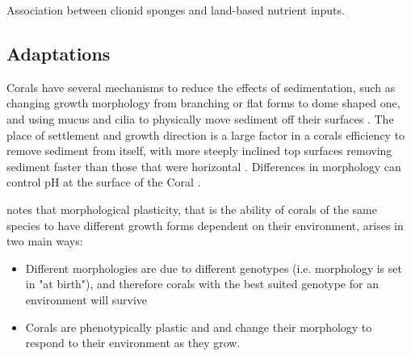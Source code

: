 \documentclass[11pt,a4paper]{article}
\begin{document}
\cite{WardPaige2005} Association between clionid sponges and land-based nutrient inputs.

\subsection{Adaptations}


Corals have several mechanisms to reduce the effects of sedimentation, such as changing growth morphology from branching or flat forms to dome shaped one, and using mucus and cilia to physically move sediment off their surfaces \citep{Logan1988, Stafford1992}.
 The place of settlement and growth direction is a large factor in a corals efficiency to remove sediment from itself, with more steeply inclined top surfaces removing sediment faster than those that were horizontal \citep{Logan1988}.
  Differences in morphology can control pH at the surface of the Coral \citep{Chan2016}.



\cite{Todd2008} notes that morphological plasticity, that is the ability of corals of the same species to have different growth forms dependent on their environment, arises in two main ways:
\begin{itemize}
\item Different morphologies are due to different genotypes (i.e. morphology is set in "at birth"), and therefore corals with the best suited genotype for an environment will survive \citep{Ayre1988}
\item  Corals are phenotypically plastic and and change their morphology to respond to their environment as they grow. \citep{Muko2000}
\end{itemize}
\end{document}
